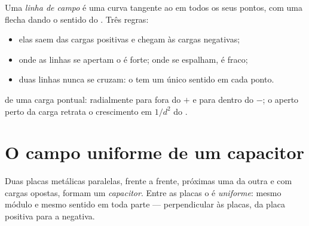 \begin{definition}\label{def:g11:electric-gravitational-fields:lines}
Uma \emph{linha de campo} é uma curva tangente ao
 em todos os seus pontos, com uma flecha dando o sentido do .
Três regras:
\begin{itemize}
  \item elas saem das cargas positivas e chegam às cargas negativas;
  \item onde as linhas se apertam o  é forte; onde se espalham, é
        fraco;
  \item duas linhas nunca se cruzam: o  tem um único sentido em cada
        ponto.
\end{itemize}
\end{definition}

\begin{omfigure}
\qquad\qquad
{}

{\small {} de uma carga pontual: radialmente para fora do
$+$ e para dentro do $-$; o aperto perto da carga retrata o crescimento
em $1/d^2$ do .}
\end{omfigure}

\section{O campo uniforme de um capacitor}

\begin{definition}\label{def:g11:electric-gravitational-fields:capacitor}
Duas placas metálicas paralelas, frente a frente, próximas uma da outra e
com cargas opostas, formam um \emph{capacitor}. Entre as
placas o  é \emph{uniforme}: mesmo módulo e
mesmo sentido em toda parte --- perpendicular às placas, da placa
positiva para a negativa.
\end{definition}

